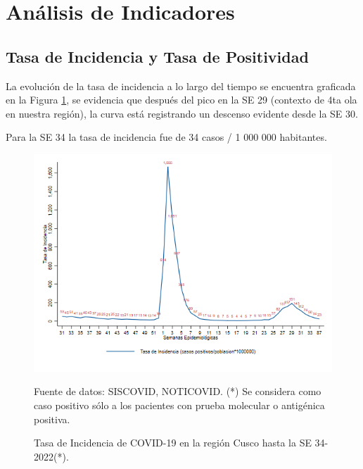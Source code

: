 \documentclass[12pt,a4paper,openany]{book}
\begin{document}
	
	
	\clearpage
	
	\section*{Análisis de Indicadores}
	\subsection*{Tasa de Incidencia y Tasa de Positividad}
	\noindent La evolución de la tasa de incidencia a lo largo del tiempo se encuentra graficada en la Figura \ref{fig:incidencia}, se evidencia que después del pico en la SE 29 (contexto de 4ta ola en nuestra región), la curva está registrando un descenso evidente desde la SE 30.
	
	Para la SE 34 la tasa de incidencia fue de 34 casos / 1 000 000  habitantes. 
	
	\begin{figure}[h]
		\caption{Tasa de Incidencia de COVID-19 en la región Cusco hasta la SE 34-2022(*).  }\label{fig:incidencia}
		\begin{center}
			\includegraphics[width=0.90\linewidth]{../figuras/tasa_incidencia_2021_2022.png}
		\end{center}
		{\footnotesize {Fuente de datos: SISCOVID, NOTICOVID. (*) Se considera como caso positivo sólo a los pacientes con prueba molecular o antigénica positiva.}}
	\end{figure}
	
\end{document}
